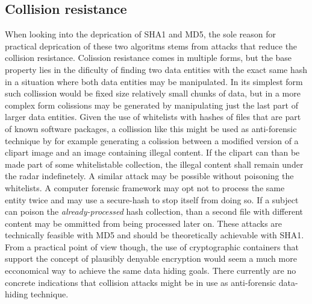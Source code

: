 \subsection{Collision resistance}
When looking into the deprication of SHA1 and MD5, the sole reason for practical deprication of these two algoritms stems from attacks that reduce the collision resistance. Colission resistance comes in multiple forms, but the base property lies in the dificulty of finding two data entities with the exact same hash in a situation where both data entities may be manipulated. In its simplest form such collission would be fixed size relatively small chunks of data, but in a more complex form colissions may be generated by manipulating just the last part of larger data entities. Given the use of whitelists with hashes of files that are part of known software packages, a collission like this might be used as anti-forensic technique by for example generating a colission between a modified version of a clipart image and an image containing illegal content. If the clipart can than be made part of some whitelistable collection, the illegal content shall remain under the radar indefinetely. A similar attack may be possible without poisoning the whitelists. A computer forensic framework may opt not to process the same entity twice and may use a secure-hash to stop itself from doing so. If a subject can poison the \emph{already-processed} hash collection, than a second file with different content may be ommitted from being processed later on. These attacks are technically feasible with MD5 and should be theoretically achievable with SHA1. From a practical point of view though, the use of cryptographic containers that support the concept of plausibly denyable encryption would seem a much more ecconomical way to achieve the same data hiding goals. There currently are no concrete indications that collision attacks might be in use as anti-forensic data-hiding technique. 
